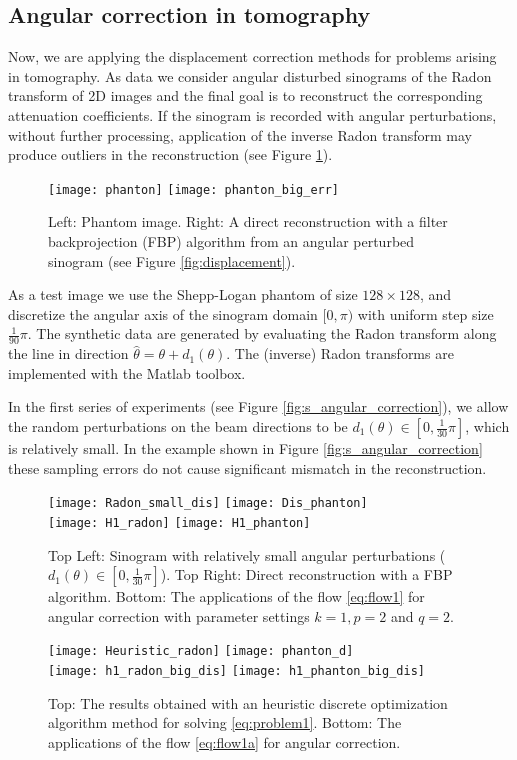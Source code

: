\documentclass[runningheads,a4paper]{llncs}\usepackage{latexsym}
\begin{document}
\subsection{Angular correction in tomography}
Now, we are applying the displacement correction methods for problems arising in tomography.
As data we consider angular disturbed sinograms of the Radon transform of 2D images and the final goal 
is to reconstruct the corresponding attenuation coefficients.
If the sinogram is recorded with angular perturbations, without further processing, application of the inverse Radon 
transform may produce outliers in the reconstruction (see Figure \ref{fig:phanton}). 
\begin{figure}
\texttt{[image: phanton]} \texttt{[image: phanton\_big\_err]}
\caption{Left: Phantom image. Right: A direct reconstruction with a filter backprojection (FBP) algorithm 
from an angular perturbed sinogram 
(see Figure \ref{fig:displacement}).}
\label{fig:phanton}
\end{figure}

As a test image we use the Shepp-Logan phantom of size $128 \times 128$, and discretize the angular axis of the sinogram 
domain $[0,\pi)$ with uniform step size $\frac{1}{90}\pi$. 
The synthetic data are generated by evaluating the Radon transform along the line in direction $\hat{\theta}=\theta+ d_1(\theta)$.
The (inverse) Radon transforms are implemented with the Matlab toolbox.

In the first series of experiments (see Figure \ref{fig:s_angular_correction}), 
we allow the random perturbations on the beam directions to be $d_1(\theta)\in [0,\frac{1}{30}\pi]$, 
which is relatively small.
In the example shown in Figure \ref{fig:s_angular_correction} these sampling errors do not cause 
significant mismatch in the reconstruction.
\begin{figure}
\texttt{[image: Radon\_small\_dis]} \texttt{[image: Dis\_phanton]}\\
\texttt{[image: H1\_radon]}  \texttt{[image: H1\_phanton]} 
\caption{Top Left: Sinogram with relatively small angular perturbations ($d_1(\theta)\in [0,\frac{1}{30}\pi]$). Top Right: Direct reconstruction with a FBP algorithm.
Bottom: The applications of the flow \eqref{eq:flow1} for angular correction with parameter settings $k=1, p=2$ and $q=2$. 
}
\label{fig:s_angular_correction}
\texttt{[image: Heuristic\_radon]} \texttt{[image: phanton\_d]}\\
\texttt{[image: h1\_radon\_big\_dis]}  \texttt{[image: h1\_phanton\_big\_dis]} 
\caption{ Top: The results obtained with an heuristic discrete optimization algorithm method for solving \eqref{eq:problem1}.  
Bottom: The applications of the flow \eqref{eq:flow1a} for angular correction.}
\label{fig:l_angular_correction}
\end{figure}
\end{document}
